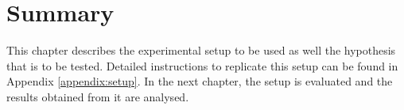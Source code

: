\section{Summary}
\label{sec:devsummary}
This chapter describes the experimental setup to be used as well the
hypothesis that is to be tested. Detailed instructions to replicate this
setup can be found in Appendix \ref{appendix:setup}. In the next
chapter, the setup is evaluated and the results obtained from it are
analysed.

